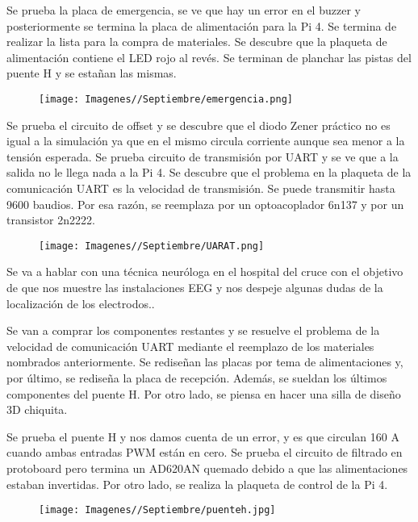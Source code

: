 \documentclass{article}
\begin{document}
\newpage
Se prueba la placa de emergencia, se ve que hay un error en el buzzer y posteriormente se termina la placa de alimentación para la Pi 4. Se termina de realizar la lista para la compra de materiales. Se descubre que la plaqueta de alimentación contiene el LED rojo al revés. Se terminan de planchar las pistas del puente H y se estañan las mismas.

\begin{figure}[H]
    \centering
    \texttt{[image: Imagenes//Septiembre/emergencia.png]}
\end{figure}

Se prueba el circuito de offset y se descubre que el diodo Zener práctico no es igual a la simulación ya que en el mismo circula corriente aunque sea menor a la tensión esperada. Se prueba circuito de transmisión por UART y se ve que a la salida no le llega nada a la Pi 4. Se descubre que el problema en la plaqueta de la comunicación UART es la velocidad de transmisión. Se puede transmitir hasta 9600 baudios. Por esa razón, se reemplaza por un optoacoplador 6n137 y por un transistor 2n2222.

\begin{figure}[H]
    \centering
    \texttt{[image: Imagenes//Septiembre/UARAT.png]}
\end{figure}

Se va a hablar con una técnica neuróloga en el hospital del cruce con el objetivo de que nos muestre las instalaciones EEG y nos despeje algunas dudas de la localización de los electrodos..



Se van a comprar los componentes restantes y se resuelve el problema de la velocidad de comunicación UART mediante el reemplazo de los materiales nombrados anteriormente. Se rediseñan las placas por tema de alimentaciones y, por último, se rediseña la placa de recepción. Además, se sueldan los últimos componentes del puente H. Por otro lado, se piensa en hacer una silla de diseño 3D chiquita.


Se prueba el puente H y nos damos cuenta de un error, y es que circulan 160 A cuando ambas entradas PWM están en cero. Se prueba el circuito de filtrado en protoboard pero termina un AD620AN quemado debido a que las alimentaciones estaban invertidas. Por otro lado, se realiza la plaqueta de control de la Pi 4.

\begin{figure}[H]
    \centering
    \texttt{[image: Imagenes//Septiembre/puenteh.jpg]}
\end{figure}
\end{document}
